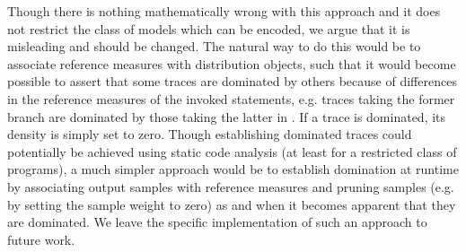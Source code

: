 Though there is nothing mathematically wrong with this approach and it does
not restrict the class of models which can be encoded, we argue that it is misleading
and should be changed.   The natural way to do this would be to associate
reference measures with distribution objects, such that it would become possible 
to assert that some traces are dominated by others because of differences in
the reference measures of the invoked \observe statements, e.g. traces taking
the former branch are dominated by those taking the latter in .
If a trace is dominated, its density is simply set to zero.
Though establishing dominated traces could
potentially be achieved using static code analysis (at least for a restricted class of
programs), a much simpler approach would be
to establish domination at runtime by associating output samples with reference
measures and pruning samples (e.g. by setting the sample weight to zero)
as and when it becomes apparent that they are dominated.  We leave the specific
implementation of such an approach to future work.